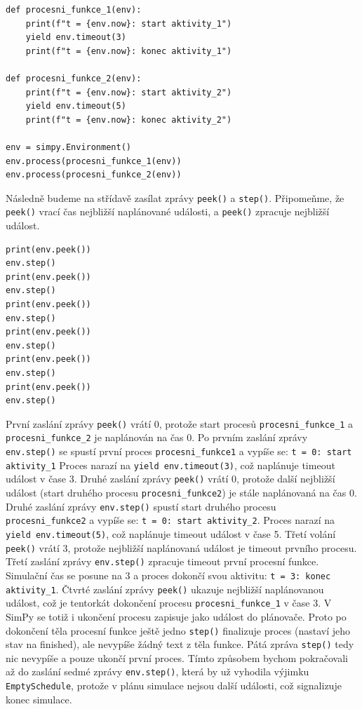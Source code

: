 \documentclass[12pt,a4paper]{article}
\begin{document}
 \begin{verbatim} 
def procesni_funkce_1(env):
    print(f"t = {env.now}: start aktivity_1")
    yield env.timeout(3)
    print(f"t = {env.now}: konec aktivity_1")

def procesni_funkce_2(env):
    print(f"t = {env.now}: start aktivity_2")
    yield env.timeout(5)
    print(f"t = {env.now}: konec aktivity_2")

env = simpy.Environment()
env.process(procesni_funkce_1(env))
env.process(procesni_funkce_2(env))

\end{verbatim}

\noindent Následně budeme na střídavě zasílat zprávy \texttt{peek()} a \texttt{step()}. Připomeňme, že \texttt{peek()}  vrací čas nejbližší naplánované události, a \texttt{peek()} zpracuje nejbližší událost.

 \begin{verbatim} 
print(env.peek())
env.step()
print(env.peek())
env.step()
print(env.peek())
env.step()
print(env.peek())
env.step()
print(env.peek())
env.step()
print(env.peek())
env.step()
\end{verbatim}

\noindent První zaslání zprávy \texttt{peek()} vrátí 0, protože start procesů \texttt{procesni\_funkce\_1} a \texttt{procesni\_funkce\_2} je naplánován na čas 0. 
Po prvním zaslání zprávy \texttt{env.step()} se spustí první proces \texttt{procesni\_funkce1} a vypíše se: \texttt{t = 0: start aktivity\_1}
Proces narazí na \texttt{yield env.timeout(3)}, což naplánuje timeout událost v čase 3. Druhé zaslání zprávy \texttt{peek()} vrátí 0, protože další nejbližší událost (start druhého procesu \texttt{procesni\_funkce2}) je stále naplánovaná na čas 0. Druhé zaslání zprávy \texttt{env.step()} spustí start druhého procesu \texttt{procesni\_funkce2} a vypíše se: \texttt{t = 0: start aktivity\_2}. Proces narazí na \texttt{yield env.timeout(5)}, což naplánuje timeout událost v čase 5. Třetí volání \texttt{peek()} vrátí 3, protože nejbližší naplánovaná událost je timeout prvního procesu. Třetí zaslání zprávy \texttt{env.step()} zpracuje timeout první procesní funkce. Simulační čas se posune na 3 a proces dokončí svou aktivitu: \texttt{t = 3: konec aktivity\_1}. Čtvrté zaslání zprávy \texttt{peek()} ukazuje nejbližší naplánovanou událost, což je tentorkát dokončení procesu \texttt{procesni\_funkce\_1} v čase 3. V SimPy se totiž i ukončení procesu zapisuje jako událost do plánovače. Proto po dokončení těla procesní funkce ještě jedno \texttt{step()} finalizuje proces (nastaví jeho stav na finished), ale nevypíše žádný text z těla funkce. Pátá zpráva \texttt{step()} tedy nic nevypíše a pouze ukončí první proces.
Tímto způsobem bychom pokračovali až do zaslání sedmé zprávy \texttt{env.step()}, která by už vyhodila výjimku \texttt{EmptySchedule}, protože v plánu simulace nejsou další události, což signalizuje konec simulace.
\end{document}
